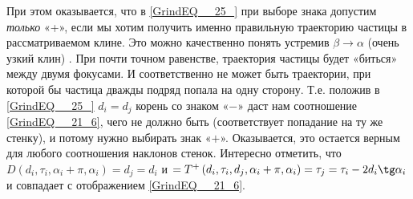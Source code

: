 \documentclass[a4paper]{article}
\begin{document}
При этом оказывается, что в \eqref{GrindEQ__25_} при выборе знака допустим \textit{только} «+», если мы хотим получить именно правильную траекторию частицы в рассматриваемом клине. Это можно качественно понять устремив $\beta \to \alpha $ (очень узкий клин) . При  почти точном равенстве, траектория частицы будет «биться» между двумя фокусами. И соответственно не может быть траектории, при которой бы частица дважды подряд попала на одну сторону. Т.е. положив в \eqref{GrindEQ__25_} $d_{i} =d_{j} $ корень со знаком «$-$» даст нам соотношение \eqref{GrindEQ__21_6}, чего не должно быть (соответствует попадание на ту же стенку),  и потому нужно выбирать знак «$+$». Оказывается, это остается верным для любого соотношения наклонов стенок. Интересно отметить, что $D\left(d_{i} ,\tau _{i},\alpha _{i}+\pi ,\alpha _{i} \right) = d_j=d_i$ и $=T^{+}\left(d_i,\tau_i,d_j,\alpha_i+\pi,\alpha_i\right)=\tau_j=\tau_i-2 d_i \tg \alpha_{i}$ и совпадает с отображением \eqref{GrindEQ__21_6}.
\end{document}
